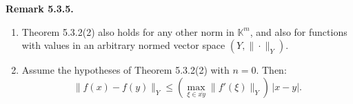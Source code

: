 \documentclass[12pt]{article}
\newenvironment{bemerkung}[1]{%
  \par\vspace{6pt}\noindent\textbf{Remark #1.}\itshape\space
}{%
  \par\vspace{6pt}
}
\begin{document}
\begin{bemerkung}{5.3.5}
\begin{enumerate}
    \item Theorem 5.3.2(2) also holds for any other norm in $\mathbb{K}^m$, and also for functions with values in an arbitrary normed vector space $(Y,\|\cdot\|_Y)$.

    \item Assume the hypotheses of Theorem 5.3.2(2) with $n=0$. Then:
    \[
        \|f(x)-f(y)\|_Y
        \le
        \left(\max_{\xi\in\overline{xy}}\|f'(\xi)\|_Y\right)\,|x-y|.
    \]
\end{enumerate}
\end{bemerkung}
\end{document}
